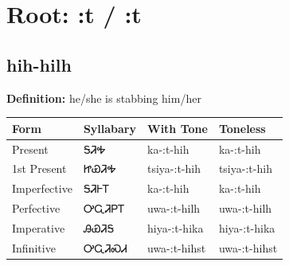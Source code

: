 \documentclass{article}%
\begin{document}
%
\normalsize%
\section*{Root: :t / :t}%
\subsection*{hih-hilh}%
\textbf{Definition: }%
he/she is stabbing him/her%
\\[0.5em]%
\begin{tabular}{|l|l|l|l|}%
\hline%
\textbf{Form}&\textbf{Syllabary}&\textbf{With Tone}&\textbf{Toneless}\\%
\hline%
Present&ᎦᏘᎭ&ka{-}:t{-}hih&ka{-}:t{-}hih\\%
1st Present&ᏥᏯᏘᎭ&tsiya{-}:t{-}hih&tsiya{-}:t{-}hih\\%
Imperfective&ᎦᏘᎰᎢ&ka{-}:t{-}hih&ka{-}:t{-}hih\\%
Perfective&ᎤᏩᏘᏢᎢ&uwa{-}:t{-}hilh&uwa{-}:t{-}hilh\\%
Imperative&ᎯᏯᏘᎦ&hiya{-}:t{-}hika&hiya{-}:t{-}hika\\%
Infinitive&ᎤᏩᏘᏍᏗ&uwa{-}:t{-}hihst&uwa{-}:t{-}hihst\\%
\hline%
\end{tabular}%
\\[1em]%
\end{document}
